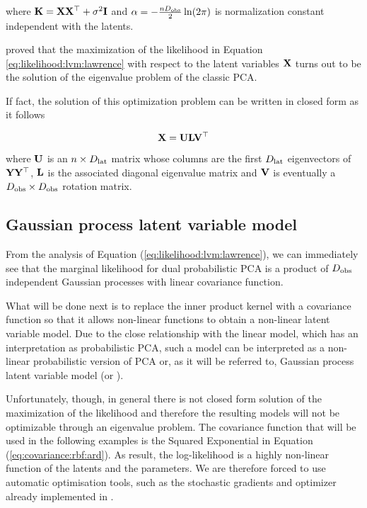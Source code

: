 where $\mathbf{K} = \mathbf{X}\mathbf{X}^\top + \sigma^2\mathbf{I}$ and $\alpha = -\tfrac{nD_\mathrm{obs}}{2}\ln(2\pi)$ is normalization constant independent with the latents.

\citet{Lawrence2005} proved that the maximization of the likelihood in Equation \ref{eq:likelihood:lvm:lawrence} with respect to the latent variables $\mathbf{X}$ turns out to be the solution of the eigenvalue problem of the classic PCA.

If fact, the solution of this optimization problem can be written in closed form as it follows

\begin{equation}
    \label{eq:ppca:latent:solution}
    \mathbf{X} = \mathbf{U}\mathbf{L}\mathbf{V}^\top
\end{equation}

where $\mathbf{U}$ is an $n\times D_\mathrm{lat}$ matrix whose columns are the first $D_\mathrm{lat}$ eigenvectors of $\mathbf{Y}\mathbf{Y}^\top$, $\mathbf{L}$ is the associated diagonal eigenvalue matrix and $\mathbf{V}$ is eventually a $D_\mathrm{obs}\times D_\mathrm{obs}$ rotation matrix.

\subsection{Gaussian process latent variable model}

From the analysis of Equation (\ref{eq:likelihood:lvm:lawrence}), we can immediately see that the marginal likelihood for dual probabilistic PCA is a product of $D_\mathrm{obs}$ independent Gaussian processes with linear covariance function.

What will be done next is to replace the inner product kernel with a covariance function so that it allows non-linear functions to obtain a non-linear latent variable model. Due to the close relationship with the linear model, which has an interpretation as probabilistic PCA, such a model can be interpreted as a non-linear probabilistic version of PCA or, as it will be referred to, Gaussian process latent variable model (or \gplvm).

Unfortunately, though, in general there is not closed form solution of the maximization of the likelihood and therefore the
resulting models will not be optimizable through an eigenvalue problem. The covariance function that will be used in the following examples is the Squared Exponential in Equation (\ref{eq:covariance:rbf:ard}). As result, the log-likelihood is a highly non-linear function of the latents and the parameters. We are therefore forced to use automatic optimisation tools, such as the stochastic gradients and \adam optimizer \citep{Kingma2015} already implemented in \tensorflow.

